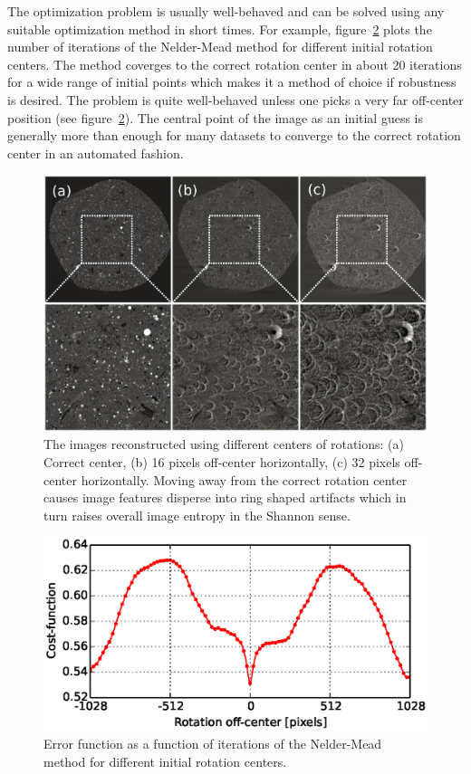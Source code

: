 \documentclass[pdf]{iucr}              %
\begin{document}
The optimization problem is usually well-behaved and can be solved using any suitable optimization method in short times. For example, figure~\ref{fig:OptimizeCenter2} plots the number of iterations of the Nelder-Mead method for different initial rotation centers. The method coverges to the correct rotation center in about 20 iterations for a wide range of initial points which makes it a method of choice if robustness is desired. The problem is quite well-behaved unless one picks a very far off-center position (see figure~\ref{fig:OptimizeCenter2}). The central point of the image as an initial guess is generally more than enough for many datasets to converge to the correct rotation center in an automated fashion.

\begin{figure}
\centering
\includegraphics[width=\textwidth]{fig_center1.eps}
\caption{The images reconstructed using different centers of rotations: (a) Correct center, (b) 16 pixels  off-center horizontally, (c) 32 pixels off-center horizontally. Moving away from the correct rotation center causes image features disperse into ring shaped artifacts which in turn raises overall image entropy in the Shannon sense.}
\label{fig:OptimizeCenter1}
\end{figure}

\begin{figure}
\centering
\includegraphics[width=\textwidth]{fig_center2.eps}
\caption{Error function as a function of iterations of the Nelder-Mead method for different initial rotation centers. }
\label{fig:OptimizeCenter2}
\end{figure}
\end{document}
